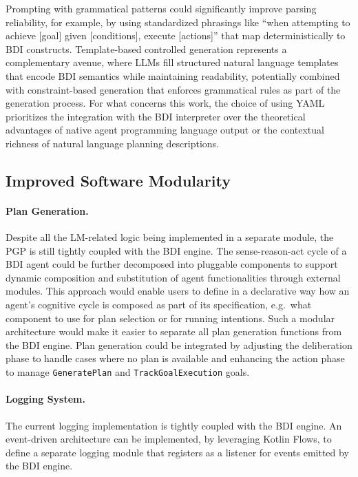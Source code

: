\documentclass[12pt,a4paper,openright,twoside]{book}
\begin{document}
Prompting with grammatical patterns could significantly improve parsing reliability, for example, by using standardized phrasings like ``when attempting to achieve [goal] given [conditions], execute [actions]'' that map deterministically to BDI constructs.
%
Template-based controlled generation represents a complementary avenue, where LLMs fill structured natural language templates that encode BDI semantics while maintaining readability, potentially combined with constraint-based generation that enforces grammatical rules as part of the generation process.
%
For what concerns this work, the choice of using YAML prioritizes the integration with the BDI interpreter over the theoretical advantages of native agent programming language output or the contextual richness of natural language planning descriptions.

\subsection{Improved Software Modularity}\label{sec:modularity}

\paragraph{Plan Generation.} Despite all the LM-related logic being implemented in a separate module, the PGP is still tightly coupled with the BDI engine.
%
The sense-reason-act cycle of a BDI agent  could be further decomposed into pluggable components to support dynamic composition and substitution of agent functionalities through external modules. 
%
This approach would enable users to define in a declarative way how an agent's cognitive cycle is composed as part of its specification, e.g.\ what component to use for plan selection or for running intentions.
%
Such a modular architecture would make it easier to separate all plan generation functions from the BDI engine.
%
Plan generation could be integrated by adjusting the deliberation phase to handle cases where no plan is available and enhancing the action phase to manage \texttt{GeneratePlan} and \texttt{TrackGoalExecution} goals.

\paragraph{Logging System.} The current logging implementation is tightly coupled with the BDI engine. An event-driven architecture can be implemented, by leveraging Kotlin Flows, to define a separate logging module that registers as a listener for events emitted by the BDI engine.
\end{document}
